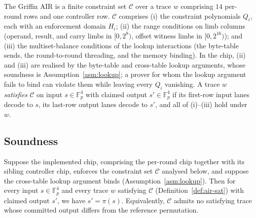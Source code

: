 \begin{definition}\label{def:air-sat}
The Griffin AIR is a finite constraint set $\mathcal{C}$ over a trace $w$ comprising $14$ per-round rows and one controller row. $\mathcal{C}$ comprises (i) the constraint polynomials $Q_i$, each with an enforcement domain $H_i$; (ii) the range conditions on limb columns (operand, result, and carry limbs in $[0,2^{8})$, offset witness limbs in $[0,2^{16})$); and (iii) the multiset-balance conditions of the lookup interactions (the byte-table sends, the round-to-round threading, and the memory binding). In the chip, (ii) and (iii) are realised by the byte-table and cross-table lookup arguments, whose soundness is Assumption~\ref{asm:lookup}; a prover for whom the lookup argument fails to bind can violate them while leaving every $Q_i$ vanishing. A trace $w$ \emph{satisfies} $\mathcal{C}$ on input $s\in\mathbb{F}_p^{4}$ with claimed output $s'\in\mathbb{F}_p^{4}$ if its first-row input lanes decode to $s$, its last-row output lanes decode to $s'$, and all of (i)--(iii) hold under $w$.
\end{definition}

\subsection{Soundness}\label{app:air-soundness}
\begin{theorem}\label{thm:air-sound}
Suppose the implemented chip, comprising the per-round chip together with its sibling controller chip, enforces the constraint set $\mathcal{C}$ analysed below, and suppose the cross-table lookup argument binds (Assumption~\ref{asm:lookup}). Then for every input $s\in\mathbb{F}_p^{4}$ and every trace $w$ satisfying $\mathcal{C}$ (Definition~\ref{def:air-sat}) with claimed output $s'$, we have $s'=\pi(s)$. Equivalently, $\mathcal{C}$ admits no satisfying trace whose committed output differs from the reference permutation.
\end{theorem}

